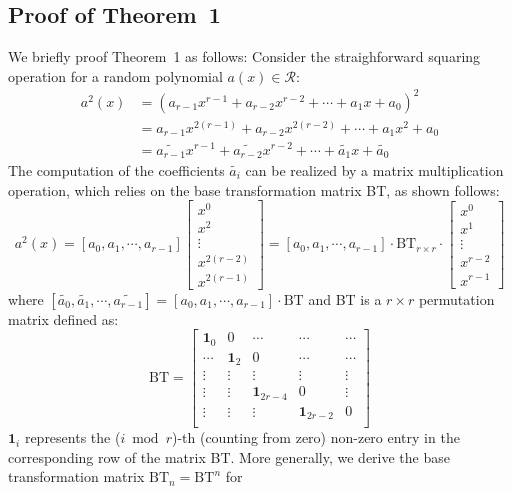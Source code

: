 \documentclass[runningheads]{llncs}
\begin{document}
\subsection{Proof of Theorem~1}
We briefly proof Theorem~1 as follows:
Consider the straighforward squaring operation for a random polynomial $a(x)\in \mathcal{R}$:
\begin{align}
    a^2(x) &= (a_{r-1}x^{r-1}+a_{r-2}x^{r-2}+\cdots + a_{1}x + a_0)^2\\
    &= a_{r-1}x^{2(r-1)}+a_{r-2}x^{2(r-2)}+\cdots + a_1x^2 + a_0\\
    &= \widetilde{a_{r-1}}x^{r-1}+\widetilde{a_{r-2}}x^{r-2}+\cdots + \widetilde{a_{1}}x +\widetilde{a_0}
\end{align}
%
The computation of the coefficients $\widetilde{a_{i}}$ can
be realized by a matrix multiplication operation,
which relies on the base transformation matrix BT, as shown follows:
\[
a^2(x)= [{a_{0}},{a_{1}},\cdots,{a_{r-1}}]\left[ \begin{array}{c}
x^{0} \\
x^{2} \\
\vdots\\
x^{2(r-2)}\\
x^{2(r-1)}
\end{array}
\right ]
=
[{a_0},{a_1},\cdots,{a_{r-1}}]
\cdot \text{BT}_{r\times r} \cdot
\left[ \begin{array}{c}
x^{0} \\
x^{1} \\
\vdots\\
x^{r-2}\\
x^{r-1}
\end{array}
\right ]
\]
where $[\widetilde{a_{0}},\widetilde{a_{1}},\cdots,\widetilde{a_{r-1}}]=[{a_{0}},{a_{1}},\cdots,{a_{r-1}}]
\cdot \text{BT}$ and BT is a $r\times r$ permutation matrix defined as:
\[
\text{BT} =
\left[ \begin{array}{ccccc}
\mathbf{1}_{0}&0&\cdots&\cdots&\cdots  \\
\cdots&\mathbf{1}_{2}&0 &\cdots&\cdots \\
\vdots&\vdots&\vdots&\vdots&\vdots\\
\vdots&\vdots&\mathbf{1}_{2r-4}&0&\vdots\\
\vdots&\vdots&\vdots&\mathbf{1}_{2r-2}&0\\
\end{array}
\right ]
\]
$\mathbf{1}_{i}$ represents the ($i\bmod r$)-th (counting from zero) non-zero entry in the corresponding row of the matrix BT.
%
More generally, we derive the base transformation matrix $\text{BT}_n=\text{BT}^n$ for
\end{document}
